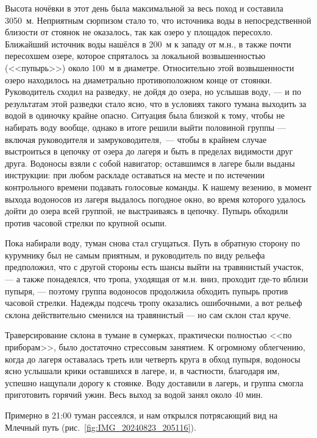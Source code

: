 Высота ночёвки в этот день была максимальной за весь поход и составила 3050~м. Неприятным сюрпизом стало то, что источника воды в непосредственной близости от стоянок не оказалось, так как озеро у площадок пересохло. Ближайший источник воды нашёлся в 200~м к западу от м.н., в также почти пересохшем озере, которое спряталось за локальной возвышенностью (<<пупырь>>) около 100~м в диаметре. Относительно этой возвышенности озеро находилось на диаметрально противоположном конце от стоянки. Руководитель сходил на разведку, не дойдя до озера, но услышав воду, --- и по результатам этой разведки стало ясно, что в условиях такого тумана выходить за водой в одиночку крайне опасно. Ситуация была близкой к тому, чтобы не набирать воду вообще, однако в итоге решили выйти половиной группы --- включая руководителя и замруководителя,~--- чтобы в крайнем случае выстроиться в цепочку от озера до лагеря и быть в пределах видимости друг друга. Водоносы взяли с собой навигатор; оставшимся в лагере были выданы инструкции: при любом раскладе оставаться на месте и по истечении контрольного времени подавать голосовые команды. К нашему везению, в момент выхода водоносов из лагеря выдалось погодное окно, во время которого удалось дойти до озера всей группой, не выстраиваясь в цепочку. Пупырь обходили против часовой стрелки по крупной осыпи. 

Пока набирали воду, туман снова стал сгущаться. Путь в обратную сторону по курумнику был не самым приятным, и руководитель по виду рельефа предположил, что с другой стороны есть шансы выйти на травянистый участок, --- а также понадеялся, что тропа, уходящая от м.н. вниз, проходит где-то вблизи пупыря, --- поэтому группа водоносов продолжила обходить пупырь против часовой стрелки. Надежды подсечь тропу оказались ошибочными, а вот рельеф склона действительно сменился на травянистый --- но сам склон стал круче.

Траверсирование склона в тумане в сумерках, практически полностью <<по приборам>>, было достаточно стрессовым занятием. К огромному облегчению, когда до лагеря оставалась треть или четверть круга в обход пупыря, водоносы ясно услышали крики оставшихся в лагере, и, в частности, благодаря им, успешно нащупали дорогу к стоянке. Воду доставили в лагерь, и группа смогла приготовить горячий ужин. Весь выход за водой занял около 40 мин.

Примерно в 21:00 туман рассеялся, и нам открылся потрясающий вид на Млечный путь (рис.~\ref{fig:IMG_20240823_205116}).

